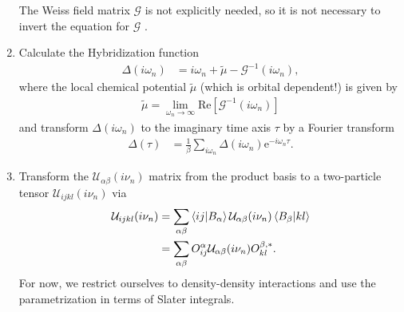 \documentclass[12pt,a4paper]{scrartcl}
\numberwithin{equation}{section}
\begin{document}
\begin{enumerate}
The Weiss field matrix $\mathscr{G}$ is not explicitly needed, so it is not necessary to
invert the equation for $\mathscr{G}$ .

\item Calculate the Hybridization function
\begin{align}
 \Delta(i\omega_n)
 &= i\omega_n + \tilde{\mu} -  \mathscr{G}^{-1}(i\omega_n),
\end{align}
where the local chemical potential $\tilde{\mu}$ (which is orbital dependent!) is given by 
\begin{align}
 \tilde{\mu} = \lim_{\omega_n\rightarrow \infty} \mathrm{Re}\left[ \mathscr{G}^{-1}(i\omega_n) \right]
\end{align}
and transform $\Delta(i\omega_n)$ to the imaginary time axis $\tau$ by a Fourier transform
\begin{align}
 \Delta(\tau) &= \frac{1}{\beta} \sum_{i\omega_n} \Delta(i\omega_n) \mathrm{e}^{-i\omega_n\tau}.
\end{align}

\item 
Transform the $\mathcal{U}_{\alpha\beta}(i\nu_n)$ matrix from the product basis to a two-particle
tensor $\mathcal{U}_{ijkl}(i\nu_n)$ via
\begin{align}
\mathcal{U}_{ijkl}(i\nu_n)
&= \sum_{\alpha\beta} \braket{ij|B_{\alpha}} \mathcal{U}_{\alpha\beta}(i\nu_n) \braket{B_{\beta}|kl} \\
&= \sum_{\alpha\beta} O^{\alpha}_{ij} \mathcal{U}_{\alpha\beta}(i\nu_n) O^{\beta,*}_{kl} .
\end{align}
For now, we restrict ourselves to density-density interactions and use the parametrization
in terms of Slater integrals.


\end{enumerate}
\end{document}
